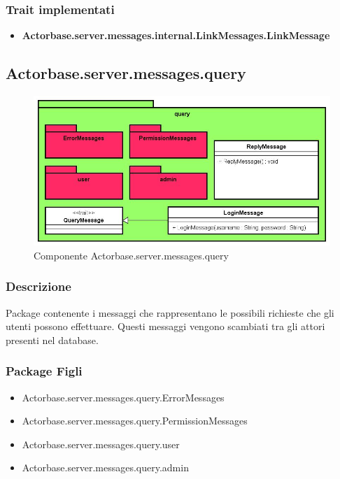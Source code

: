 \documentclass[a4paper]{article}
\begin{document}
			\subsubsection{Trait implementati}
				\begin{itemize}
					\item \textbf{Actorbase.server.messages.internal.LinkMessages.LinkMessage} 
				\end{itemize}
				
		\subsection{Actorbase.server.messages.query}
		
			\begin{figure}[H]
				\centering
				\includegraphics[width=\textwidth]{ST/Server/queryLevel}
				\caption{Componente Actorbase.server.messages.query}
			\end{figure}
			
			\subsubsection{Descrizione}
				Package contenente i messaggi che rappresentano le possibili richieste che gli utenti possono effettuare. Questi messaggi vengono 
				scambiati tra gli attori presenti nel database.
				
			\subsubsection{Package Figli}
				\begin{itemize}
					\item Actorbase.server.messages.query.ErrorMessages
					\item Actorbase.server.messages.query.PermissionMessages
					\item Actorbase.server.messages.query.user
					\item Actorbase.server.messages.query.admin
				\end{itemize}
				
\end{document}
